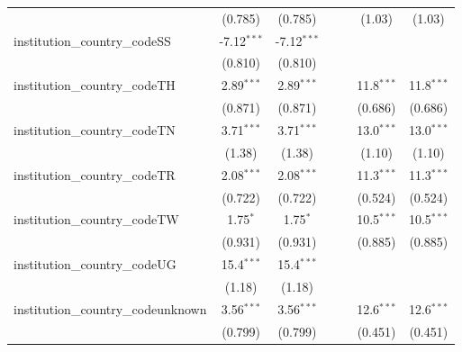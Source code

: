 \begin{tabular}{lcccccc}
                                         & (0.785)        & (0.785)        &               &               & (1.03)        & (1.03)\\   
   institution\_country\_codeSS          & -7.12$^{***}$  & -7.12$^{***}$  &               &               &               &   \\   
                                         & (0.810)        & (0.810)        &               &               &               &   \\   
   institution\_country\_codeTH          & 2.89$^{***}$   & 2.89$^{***}$   &               &               & 11.8$^{***}$  & 11.8$^{***}$\\   
                                         & (0.871)        & (0.871)        &               &               & (0.686)       & (0.686)\\   
   institution\_country\_codeTN          & 3.71$^{***}$   & 3.71$^{***}$   &               &               & 13.0$^{***}$  & 13.0$^{***}$\\   
                                         & (1.38)         & (1.38)         &               &               & (1.10)        & (1.10)\\   
   institution\_country\_codeTR          & 2.08$^{***}$   & 2.08$^{***}$   &               &               & 11.3$^{***}$  & 11.3$^{***}$\\   
                                         & (0.722)        & (0.722)        &               &               & (0.524)       & (0.524)\\   
   institution\_country\_codeTW          & 1.75$^{*}$     & 1.75$^{*}$     &               &               & 10.5$^{***}$  & 10.5$^{***}$\\   
                                         & (0.931)        & (0.931)        &               &               & (0.885)       & (0.885)\\   
   institution\_country\_codeUG          & 15.4$^{***}$   & 15.4$^{***}$   &               &               &               &   \\   
                                         & (1.18)         & (1.18)         &               &               &               &   \\   
   institution\_country\_codeunknown     & 3.56$^{***}$   & 3.56$^{***}$   &               &               & 12.6$^{***}$  & 12.6$^{***}$\\   
                                         & (0.799)        & (0.799)        &               &               & (0.451)       & (0.451)\\   

\end{tabular}
